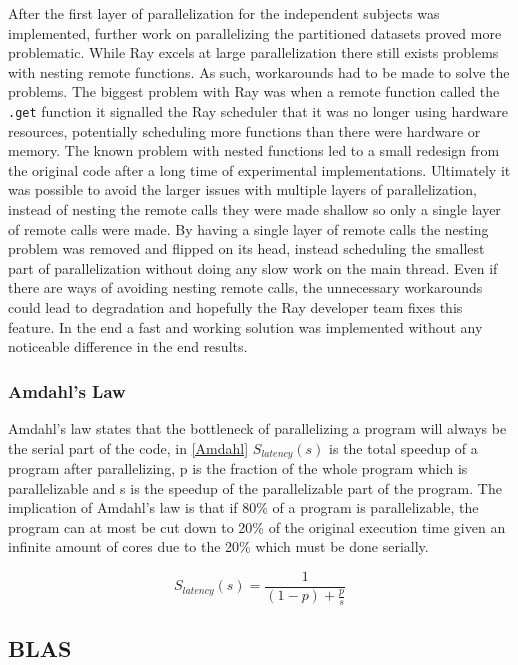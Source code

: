 \documentclass[12pt, a4paper]{article}
\begin{document}
After the first layer of parallelization for the independent subjects was implemented, further work on parallelizing the partitioned datasets proved more problematic.
While Ray excels at large parallelization there still exists problems with nesting remote functions. As such, workarounds had to be made to solve the problems.
The biggest problem with Ray was when a remote function called the \texttt{.get} function it signalled the Ray scheduler that it was no longer using hardware resources, potentially scheduling more functions than there were hardware or memory.
The known problem with nested functions led to a small redesign from the original code after a long time of experimental implementations. 
Ultimately it was possible to avoid the larger issues with multiple layers of parallelization, instead of nesting the remote calls they were made shallow so only a single layer of remote calls were made.
By having a single layer of remote calls the nesting problem was removed and flipped on its head, instead scheduling the smallest part of parallelization without doing any slow work on the main thread. 
Even if there are ways of avoiding nesting remote calls, the unnecessary workarounds could lead to degradation and hopefully the Ray developer team fixes this feature. 
In the end a fast and working solution was implemented without any noticeable difference in the end results.

\subsubsection{Amdahl's Law}

Amdahl's law states that the bottleneck of parallelizing a program will always be the serial part of the code, in \cref{Amdahl} $S_{latency}(s)$ is the total speedup of a program after parallelizing, p is the fraction of the whole program which is parallelizable and s is the speedup of the parallelizable part of the program.
The implication of Amdahl's law is that if 80\% of a program is parallelizable, the program can at most be cut down to 20\% of the original execution time given an infinite amount of cores due to the 20\% which must be done serially.

\begin{equation}\label{Amdahl}
    S_{latency}(s) = \frac{1}{(1-p) + \frac{p}{s}}
\end{equation}

\subsection{BLAS}
\end{document}
